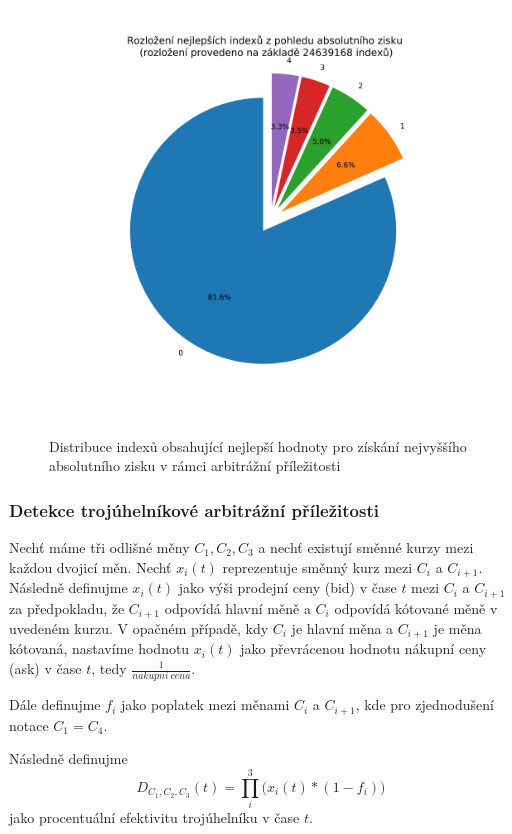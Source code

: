 \documentclass[thesis=B,czech]{FITthesis}[2019/03/21]
\begin{document}
\begin{figure}\centering
	\includegraphics[width=1\textwidth]{images/index_distribution.png}
	\caption{Distribuce indexů obsahující nejlepší hodnoty pro získání nejvyššího absolutního zisku v rámci arbitrážní příležitosti}\label{index_distribution}
\end{figure}
\subsubsection{Detekce trojúhelníkové arbitrážní příležitosti}
Nechť máme tři odlišné měny \(C_1,C_2,C_3\) a nechť existují směnné kurzy mezi každou dvojicí měn. Nechť \(x_i(t)\) reprezentuje směnný kurz mezi \(C_i\) a \(C_{i+1}\). Následně definujme \(x_i(t)\) jako výši prodejní ceny (bid) v čase \(t\) mezi \(C_i\) a \(C_{i+1}\) za předpokladu, že \(C_{i+1}\) odpovídá hlavní měně a \(C_{i}\) odpovídá kótované měně v uvedeném kurzu. V opačném případě, kdy \(C_{i}\) je hlavní měna a \(C_{i+1}\) je měna kótovaná, nastavíme hodnotu \(x_i(t)\) jako převrácenou hodnotu nákupní ceny (ask) v čase \(t\), tedy \(\frac{1}{nakupni\:cena}\).

Dále definujme \(f_i\) jako poplatek mezi měnami \(C_i\) a \(C_{i+1}\), kde pro zjednodušení notace \(C_1 = C_4\).

Následně definujme
\[D_{C_1,C_2,C_3}(t) = \prod_i^3\Big(x_i(t)*(1-f_i)\Big)\]
jako procentuální efektivitu trojúhelníku v čase \(t\).
\end{document}
